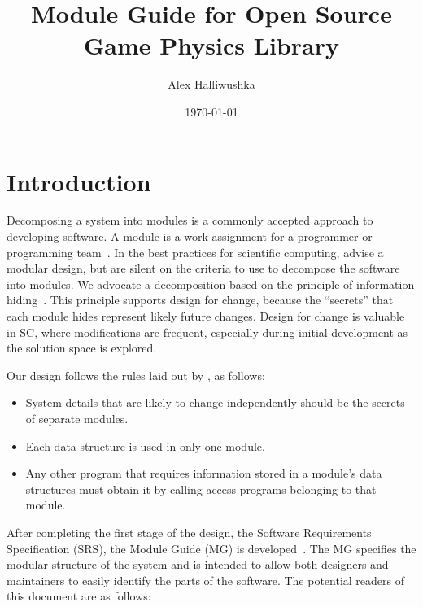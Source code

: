 \documentclass[12pt]{article}
\begin{document}
\title{Module Guide for Open Source 
  Game Physics Library} 
\author{Alex Halliwushka}
\date{\today}
	
\maketitle

\tableofcontents

\newpage

\section{Introduction}

Decomposing a system into modules is a commonly accepted approach to developing
software.  A module is a work assignment for a programmer or programming
team~\citep{ParnasEtAl1984}.  In the best practices for scientific computing,
\citet{WilsonEtAl2013} advise a modular design, but are silent on the criteria
to use to decompose the software into modules.  We advocate a decomposition
based on the principle of information hiding~\citep{Parnas1972a}.  This
principle supports design for change, because the ``secrets'' that each module
hides represent likely future changes.  Design for change is valuable in SC,
where modifications are frequent, especially during initial development as the
solution space is explored.  

Our design follows the rules laid out by \citet{ParnasEtAl1984}, as follows:
\begin{itemize}
\item System details that are likely to change independently should be the
  secrets of separate modules.
\item Each data structure is used in only one module.
\item Any other program that requires information stored in a module's data
  structures must obtain it by calling access programs belonging to that module.
\end{itemize}

After completing the first stage of the design, the Software Requirements
Specification (SRS), the Module Guide (MG) is developed~\citep{ParnasEtAl1984}. The MG
specifies the modular structure of the system and is intended to allow both
designers and maintainers to easily identify the parts of the software.  The
potential readers of this document are as follows:
\end{document}
